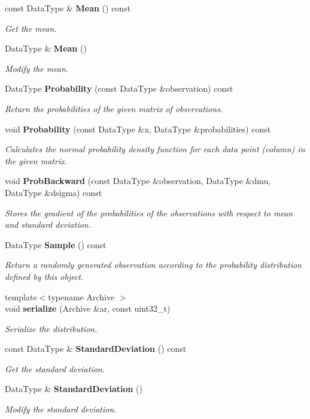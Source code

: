 \begin{DoxyCompactItemize}
const Data\+Type \& \textbf{ Mean} () const
\begin{DoxyCompactList}\small\item\em Get the mean. \end{DoxyCompactList}\item 
Data\+Type \& \textbf{ Mean} ()
\begin{DoxyCompactList}\small\item\em Modify the mean. \end{DoxyCompactList}\item 
Data\+Type \textbf{ Probability} (const Data\+Type \&observation) const
\begin{DoxyCompactList}\small\item\em Return the probabilities of the given matrix of observations. \end{DoxyCompactList}\item 
void \textbf{ Probability} (const Data\+Type \&x, Data\+Type \&probabilities) const
\begin{DoxyCompactList}\small\item\em Calculates the normal probability density function for each data point (column) in the given matrix. \end{DoxyCompactList}\item 
void \textbf{ Prob\+Backward} (const Data\+Type \&observation, Data\+Type \&dmu, Data\+Type \&dsigma) const
\begin{DoxyCompactList}\small\item\em Stores the gradient of the probabilities of the observations with respect to mean and standard deviation. \end{DoxyCompactList}\item 
Data\+Type \textbf{ Sample} () const
\begin{DoxyCompactList}\small\item\em Return a randomly generated observation according to the probability distribution defined by this object. \end{DoxyCompactList}\item 
{\footnotesize template$<$typename Archive $>$ }\\void \textbf{ serialize} (Archive \&ar, const uint32\+\_\+t)
\begin{DoxyCompactList}\small\item\em Serialize the distribution. \end{DoxyCompactList}\item 
const Data\+Type \& \textbf{ Standard\+Deviation} () const
\begin{DoxyCompactList}\small\item\em Get the standard deviation. \end{DoxyCompactList}\item 
Data\+Type \& \textbf{ Standard\+Deviation} ()
\begin{DoxyCompactList}\small\item\em Modify the standard deviation. \end{DoxyCompactList}\end{DoxyCompactItemize}


